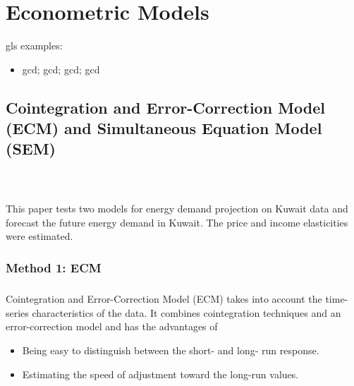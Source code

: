 \chapter{Econometric Models}\label{chp:Econometric_Models}

\minitoc

gls examples:
\begin{itemize}
	\item \Gls{gcd}; \acrlong{gcd}; \acrshort{gcd}; \acrfull{gcd}
\end{itemize}


\section{Cointegration and Error-Correction Model (ECM) and Simultaneous Equation Model (SEM)}
\cite{NaiefEltony1995}\\
	 \paragraph{}{This paper tests two models for energy demand projection on Kuwait data and forecast the future energy demand in Kuwait. The price and income elasticities were estimated.}

\subsection{Method 1: ECM}
\paragraph{}{
Cointegration and Error-Correction Model (ECM) takes into account the time-series characteristics of the data. It combines cointegration techniques and an error-correction model and has the advantages of
\begin{itemize}
	\item Being easy to distinguish between the short- and long- run response.
	\item Estimating the speed of adjustment toward the long-run values.
\end{itemize} 	
}

